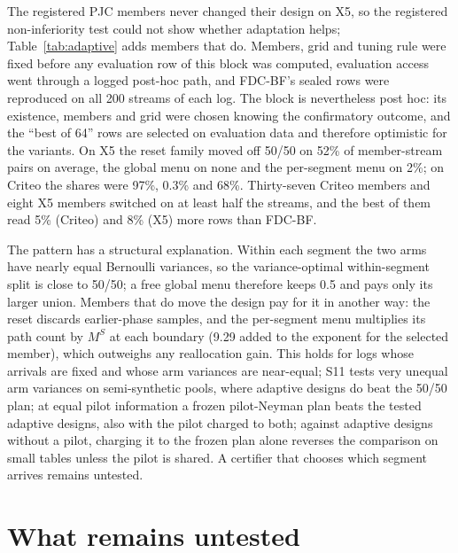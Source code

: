 \documentclass[sigconf,anonymous,review]{acmart}
\begin{document}
The registered PJC members never changed their design on X5, so the registered non-inferiority test could not show whether adaptation helps; Table~\ref{tab:adaptive} adds members that do. Members, grid and tuning rule were fixed before any evaluation row of this block was computed, evaluation access went through a logged post-hoc path, and FDC-BF's sealed rows were reproduced on all 200 streams of each log. The block is nevertheless post hoc: its existence, members and grid were chosen knowing the confirmatory outcome, and the ``best of 64'' rows are selected on evaluation data and therefore optimistic for the variants. On X5 the reset family moved off 50/50 on 52\% of member-stream pairs on average, the global menu on none and the per-segment menu on 2\%; on Criteo the shares were 97\%, 0.3\% and 68\%. Thirty-seven Criteo members and eight X5 members switched on at least half the streams, and the best of them read 5\% (Criteo) and 8\% (X5) more rows than FDC-BF.

The pattern has a structural explanation. Within each segment the two arms have nearly equal Bernoulli variances, so the variance-optimal within-segment split is close to 50/50; a free global menu therefore keeps 0.5 and pays only its larger union. Members that do move the design pay for it in another way: the reset discards earlier-phase samples, and the per-segment menu multiplies its path count by $M^S$ at each boundary (9.29 added to the exponent for the selected member), which outweighs any reallocation gain. This holds for logs whose arrivals are fixed and whose arm variances are near-equal; S11 tests very unequal arm variances on semi-synthetic pools, where adaptive designs do beat the 50/50 plan; at equal pilot information a frozen pilot-Neyman plan beats the tested adaptive designs, also with the pilot charged to both; against adaptive designs without a pilot, charging it to the frozen plan alone reverses the comparison on small tables unless the pilot is shared. A certifier that chooses which segment arrives remains untested.

\section{What remains untested}\label{app:sens}
\end{document}

